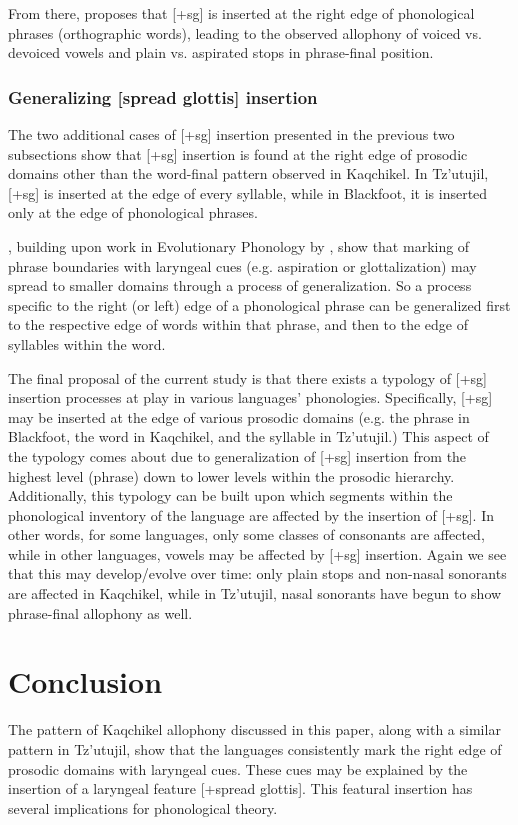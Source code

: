\documentclass[output=paper,colorlinks,citecolor=brown]{langscibook}
\begin{document}
From there, \citet{windsor_2016} proposes that [+sg] is inserted at the right edge of phonological phrases (orthographic words), leading to the observed allophony of voiced vs. devoiced vowels and plain vs. aspirated stops in phrase-final position.

\subsubsection{Generalizing [spread glottis] insertion}
The two additional cases of [+sg] insertion presented in the previous two subsections show that [+sg] insertion is found at the right edge of prosodic domains other than the word-final pattern observed in Kaqchikel. In Tz’utujil, [+sg] is inserted at the edge of every syllable, while in Blackfoot, it is inserted only at the edge of phonological phrases.

\citet{iverson_salmons_2007}, building upon work in Evolutionary Phonology by \citet{Blevins2004, blevins_2006}, show that marking of phrase boundaries with laryngeal cues (e.g. aspiration or glottalization) may spread to smaller domains through a process of generalization. So a process specific to the right (or left) edge of a phonological phrase can be generalized first to the respective edge of words within that phrase, and then to the edge of syllables within the word.

The final proposal of the current study is that there exists a typology of [+sg] insertion processes at play in various languages’ phonologies. Specifically, [+sg] may be inserted at the edge of various prosodic domains (e.g. the phrase in Blackfoot, the word in Kaqchikel, and the syllable in Tz’utujil.) This aspect of the typology comes about due to generalization of [+sg] insertion from the highest level (phrase) down to lower levels within the prosodic hierarchy. Additionally, this typology can be built upon which segments within the phonological inventory of the language are affected by the insertion of [+sg]. In other words, for some languages, only some classes of consonants are affected, while in other languages, vowels may be affected by [+sg] insertion. Again we see that this may develop/evolve over time: only plain stops and non-nasal sonorants are affected in Kaqchikel, while in Tz’utujil, nasal sonorants have begun to show phrase-final allophony as well.

\section{Conclusion}\label{Conclusion}
\largerpage
The pattern of Kaqchikel allophony discussed in this paper, along with a similar pattern in Tz’utujil, show that the languages consistently mark the right edge of prosodic domains with laryngeal cues. These cues may be explained by the insertion of a laryngeal feature [+spread glottis]. This featural insertion has several implications for phonological theory. 
\end{document}
